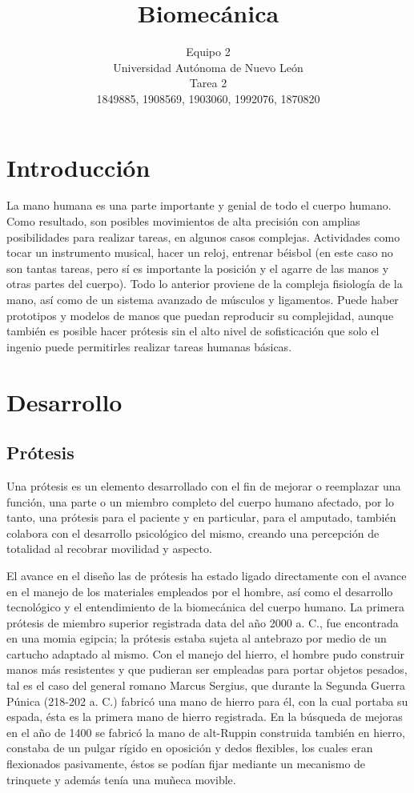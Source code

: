 \documentclass[a4paper]{article}
\title{Biomecánica}
\author{Equipo 2\\
  \small Universidad Autónoma de Nuevo León\\
  \small Tarea 2\\
  \small 1849885, 1908569, 1903060, 1992076, 1870820\\
  \date{}
}
\begin{document}
\maketitle

\section{Introducci\'on}
La mano humana es una parte importante y genial de todo el cuerpo humano. Como resultado, son posibles movimientos de alta precisión con amplias posibilidades para realizar tareas, en algunos casos complejas. Actividades como tocar un instrumento musical, hacer un reloj, entrenar béisbol (en este caso no son tantas tareas, pero sí es importante la posición y el agarre de las manos y otras partes del cuerpo). Todo lo anterior proviene de la compleja fisiología de la mano, así como de un sistema avanzado de músculos y ligamentos. Puede haber prototipos y modelos de manos que puedan reproducir su complejidad, aunque también es posible hacer prótesis sin el alto nivel de sofisticación que solo el ingenio puede permitirles realizar tareas humanas básicas. 


\section{Desarrollo}
\subsection{Prótesis}
Una prótesis es un elemento desarrollado con el fin de mejorar o reemplazar una función, una parte o un miembro completo del cuerpo humano afectado, por lo tanto, una prótesis para el paciente y en particular, para el amputado, también colabora con el desarrollo psicológico del mismo, creando una percepción de totalidad al recobrar movilidad y aspecto. 

El avance en el diseño las de prótesis ha estado ligado directamente con el avance en el manejo de los materiales empleados por el hombre, así como el desarrollo tecnológico y el entendimiento de la biomecánica del cuerpo humano. La primera prótesis de miembro superior registrada data del año 2000 a. C., fue encontrada en una momia egipcia; la prótesis estaba sujeta al antebrazo por medio de un cartucho adaptado al mismo. Con el manejo del hierro, el hombre pudo construir manos más resistentes y que pudieran ser empleadas para portar objetos pesados, tal es el caso del general romano Marcus Sergius, que durante la Segunda Guerra Púnica (218-202 a. C.) fabricó una mano de hierro para él, con la cual portaba su espada, ésta es la primera mano de hierro registrada. En la búsqueda de mejoras en el año de 1400 se fabricó la mano de alt-Ruppin construida también en hierro, constaba de un pulgar rígido en oposición y dedos flexibles, los cuales eran flexionados pasivamente, éstos se podían fijar mediante un mecanismo de trinquete y además tenía una muñeca movible. 
\end{document}
